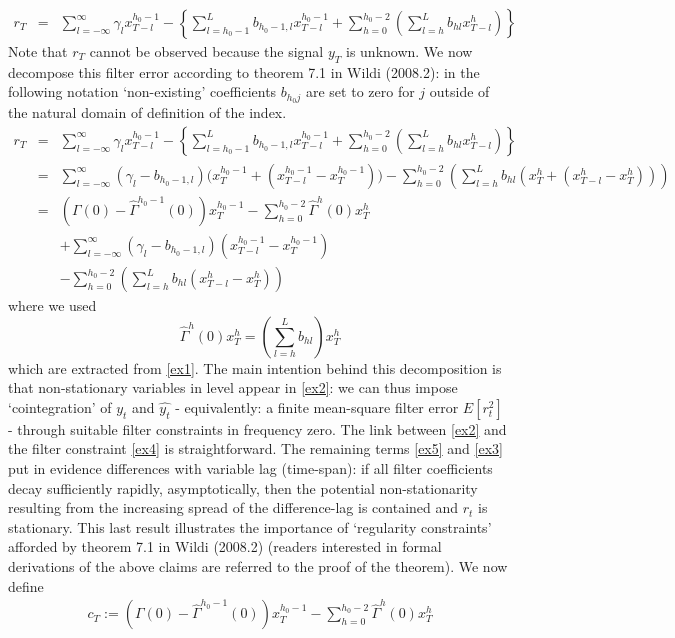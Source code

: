 \documentclass[11pt]{article}
\begin{document}
\begin{eqnarray*}
r_T&=&\sum_{l=-\infty}^\infty\gamma_{l}x_{T-l}^{h_0-1}-\left\{\sum_{l=h_0-1}^{L}{b}_{h_0-1,l}x_{T-l}^{h_0-1}+
\sum_{h=0}^{h_0-2}\left(
\sum_{l=h}^{L}b_{hl}x_{T-l}^h\right)\right\}
\end{eqnarray*}
Note that $r_T$ cannot be observed because the signal $y_T$ is unknown. We now decompose this filter error according to theorem 7.1 in Wildi (2008.2): in the following notation `non-existing' coefficients ${b}_{h_0j}$ are set to zero for $j$ outside of the natural domain of definition of the index.
\begin{eqnarray}
r_T&=&\sum_{l=-\infty}^\infty\gamma_{l}x_{T-l}^{h_0-1}-
\left\{\sum_{l=h_0-1}^{L}{b}_{h_0-1,l}x_{T-l}^{h_0-1}+
\sum_{h=0}^{h_0-2}\left(
\sum_{l=h}^{L}b_{hl}x_{T-l}^h\right)\right\}\nonumber\\
&=&\sum_{l=-\infty}^\infty({\gamma}_{l}-{b}_{h_0-1,l})\Big(x_T^{h_0-1}+(x_{T-l}^{h_0-1}-x_T^{h_0-1})\Big)-
\sum_{h=0}^{h_0-2}\left(
\sum_{l=h}^{L}b_{hl}\left(x_T^h+(x_{T-l}^h-x_T^h)\right)\right)
\label{ex1}\\
&=&(\Gamma(0)-{\hat{\Gamma}}^{h_0-1}(0))x_T^{h_0-1}-
\sum_{h=0}^{h_0-2}\hat{\Gamma}^{h}(0)x_T^h\label{ex2}\\
&&+\sum_{l=-\infty}^\infty({\gamma}_{l}-{b}_{h_0-1,l})(x_{T-l}^{h_0-1}-x_T^{h_0-1})\label{ex5}\\
&&-
\sum_{h=0}^{h_0-2}\left(
\sum_{l=h}^{L}b_{hl}(x_{T-l}^h-x_T^h)\right)\label{ex3}
\end{eqnarray}
where we used
\[
\hat{\Gamma}^h(0)x_T^h=\left(\sum_ {l=h}^{L}b_{hl}\right)x_T^h
\]
which are extracted from \ref{ex1}. The main intention behind this decomposition is that non-stationary variables in level appear in \ref{ex2}: we can thus impose `cointegration' of $y_t$ and $\hat{y_t}$ - equivalently: a finite mean-square filter error $E[r_t^2]$ -  through suitable filter constraints in frequency zero. The link between \ref{ex2} and the filter constraint \ref{ex4} is straightforward. The remaining terms \ref{ex5} and \ref{ex3} put in evidence differences with variable lag (time-span): if all filter coefficients decay sufficiently rapidly, asymptotically, then the potential non-stationarity resulting from the increasing spread of the difference-lag is contained and $r_t$ is stationary. This last result illustrates the importance of `regularity constraints' afforded by theorem 7.1 in Wildi (2008.2) (readers interested in formal derivations of the above claims are referred to the proof of the theorem). We now define
\begin{eqnarray}\label{cointt}
c_T:=(\Gamma(0)-{\hat{\Gamma}}^{h_0-1}(0))x_T^{h_0-1}-
\sum_{h=0}^{h_0-2}\hat{\Gamma}^{h}(0)x_T^h
\end{eqnarray}
\end{document}

